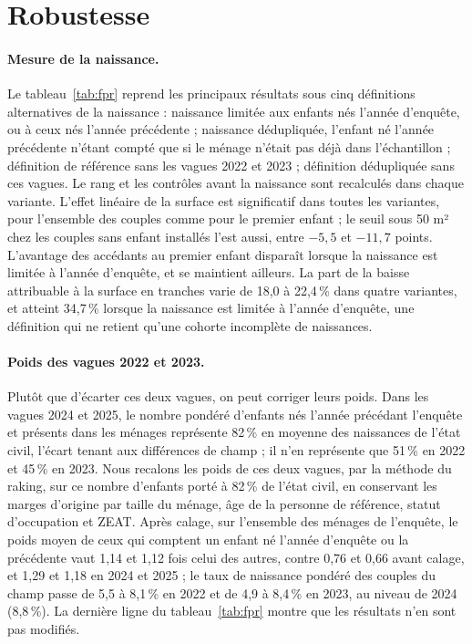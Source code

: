 \documentclass[11pt,a4paper]{article}
\theoremstyle{plain}
\theoremstyle{definition}
\theoremstyle{remark}
\begin{document}
\section{Robustesse}\label{app:robustesse}

\paragraph{Mesure de la naissance.} Le tableau~\ref{tab:fpr} reprend les principaux résultats sous cinq définitions alternatives de la naissance : naissance limitée aux enfants nés l'année d'enquête, ou à ceux nés l'année précédente ; naissance dédupliquée, l'enfant né l'année précédente n'étant compté que si le ménage n'était pas déjà dans l'échantillon ; définition de référence sans les vagues 2022 et 2023 ; définition dédupliquée sans ces vagues. Le rang et les contrôles avant la naissance sont recalculés dans chaque variante. L'effet linéaire de la surface est significatif dans toutes les variantes, pour l'ensemble des couples comme pour le premier enfant ; le seuil sous 50 m² chez les couples sans enfant installés l'est aussi, entre $-5{,}5$ et $-11{,}7$ points. L'avantage des accédants au premier enfant disparaît lorsque la naissance est limitée à l'année d'enquête, et se maintient ailleurs. La part de la baisse attribuable à la surface en tranches varie de 18,0 à 22,4\,\% dans quatre variantes, et atteint 34,7\,\% lorsque la naissance est limitée à l'année d'enquête, une définition qui ne retient qu'une cohorte incomplète de naissances.

\paragraph{Poids des vagues 2022 et 2023.} Plutôt que d'écarter ces deux vagues, on peut corriger leurs poids. Dans les vagues 2024 et 2025, le nombre pondéré d'enfants nés l'année précédant l'enquête et présents dans les ménages représente 82\,\% en moyenne des naissances de l'état civil, l'écart tenant aux différences de champ ; il n'en représente que 51\,\% en 2022 et 45\,\% en 2023. Nous recalons les poids de ces deux vagues, par la méthode du raking, sur ce nombre d'enfants porté à 82\,\% de l'état civil, en conservant les marges d'origine par taille du ménage, âge de la personne de référence, statut d'occupation et ZEAT. Après calage, sur l'ensemble des ménages de l'enquête, le poids moyen de ceux qui comptent un enfant né l'année d'enquête ou la précédente vaut 1,14 et 1,12 fois celui des autres, contre 0,76 et 0,66 avant calage, et 1,29 et 1,18 en 2024 et 2025 ; le taux de naissance pondéré des couples du champ passe de 5,5 à 8,1\,\% en 2022 et de 4,9 à 8,4\,\% en 2023, au niveau de 2024 (8,8\,\%). La dernière ligne du tableau~\ref{tab:fpr} montre que les résultats n'en sont pas modifiés.
\end{document}
